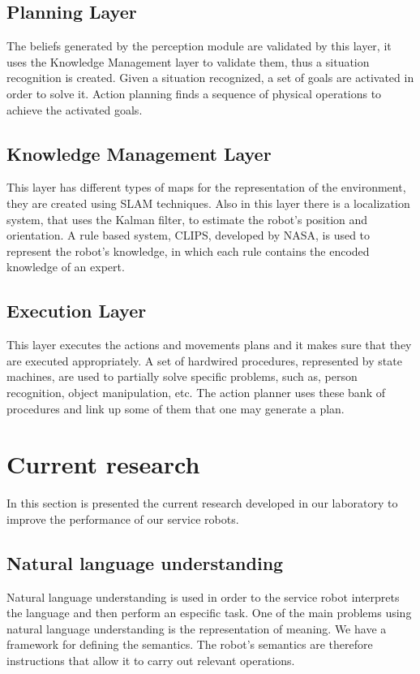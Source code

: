 \documentclass{llncs}
\begin{document}
\subsection{Planning Layer}

The beliefs generated by the perception module are validated by this layer, it uses the Knowledge Management layer to validate them, thus a situation recognition is created. 
Given a situation recognized, a set of goals are activated in order to solve it.
Action planning finds a sequence of physical operations to achieve the activated goals.


\subsection{Knowledge Management Layer}

This layer has different types of maps for the representation of the environment, they are created using 
SLAM techniques.
Also in this layer there is a localization system, that uses the Kalman filter, to estimate the robot's position and orientation.
A rule based system, CLIPS, developed by NASA, is used to represent the robot's knowledge, in which each rule contains the encoded knowledge of an expert.


\subsection{Execution Layer}
This layer executes the actions and movements plans and it makes sure that they are executed appropriately.
A set of hardwired procedures, represented by state machines, are used to partially solve specific problems, such as, person recognition, object manipulation, etc. The action planner uses these bank of procedures and link up some of them that one may generate a plan.



\section{Current research}\label{sec:CurrentResearch}
In this section is presented the current research developed in our laboratory to improve the performance of our service robots.

\subsection{Natural language understanding}\label{subsec:NaturalLU}
Natural language understanding is used in order to the service robot interprets the language and then perform an especific task.
One of the main problems using natural language understanding is the representation of meaning.  
We have a framework for defining the semantics. The robot's semantics are therefore instructions that allow it to carry out relevant operations.
\end{document}

